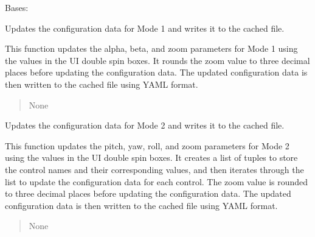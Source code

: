 \documentclass[a4paper,10pt,english,openany, oneside]{sphinxmanual}
\begin{document}
\begin{fulllineitems}
\label{\detokenize{test:test.AnypointConfig}}
\pysigstartsignatures
{}
\pysigstopsignatures
\sphinxAtStartPar
Bases: 

\begin{fulllineitems}
\label{\detokenize{test:test.AnypointConfig.change_properties_mode_1}}
\pysigstartsignatures
{}
\pysigstopsignatures
\sphinxAtStartPar
Updates the configuration data for Mode 1 and writes it to the cached file.

\sphinxAtStartPar
This function updates the alpha, beta, and zoom parameters for Mode 1 using the
values in the UI double spin boxes. It rounds the zoom value to three decimal places
before updating the configuration data. The updated configuration data is then
written to the cached file using YAML format.
\begin{quote}\begin{description}
\sphinxAtStartPar
None

\end{description}\end{quote}

\end{fulllineitems}


\begin{fulllineitems}
\label{\detokenize{test:test.AnypointConfig.change_properties_mode_2}}
\pysigstartsignatures
{}
\pysigstopsignatures
\sphinxAtStartPar
Updates the configuration data for Mode 2 and writes it to the cached file.

\sphinxAtStartPar
This function updates the pitch, yaw, roll, and zoom parameters for Mode 2 using the
values in the UI double spin boxes. It creates a list of tuples to store the control
names and their corresponding values, and then iterates through the list to update
the configuration data for each control. The zoom value is rounded to three decimal
places before updating the configuration data. The updated configuration data is
then written to the cached file using YAML format.
\begin{quote}\begin{description}
\sphinxAtStartPar
None


\end{description}
\end{quote}
\end{fulllineitems}
\end{fulllineitems}
\end{document}
